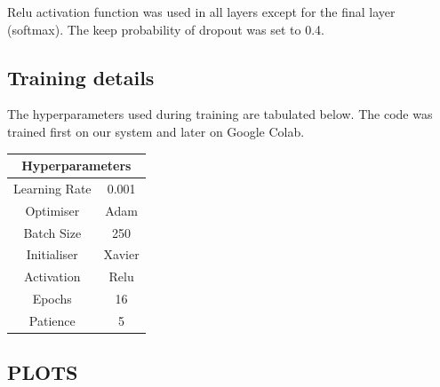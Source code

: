 \documentclass[12pt]{report}
\begin{document}
Relu activation function was used in all layers except for the final layer (softmax). The keep probability of dropout was set to 0.4.

\subsection{Training details}
The hyperparameters used during training are tabulated below. The code was trained first on our system and later on Google Colab.
\begin{table}[H]
	\label{T:equipos}
	\begin{center}
		\begin{tabular}{| c | c |}
			\hline
			\multicolumn{2}{|c|}{\textbf{Hyperparameters}} \\
            \hline
            Learning Rate & 0.001 \\
            Optimiser & Adam \\
            \hline
            Batch Size & 250 \\
            \hline
            Initialiser & Xavier\\
            \hline
            Activation & Relu \\
            \hline
            Epochs & 16 \\
            Patience & 5 \\
            \hline
		\end{tabular}
	\end{center}
\end{table}

\subsection{PLOTS}
\end{document}
